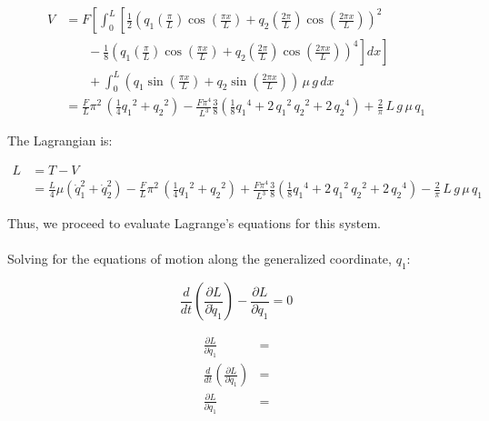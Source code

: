 \documentclass[12pt, letterpaper]{../assignment}
\begin{document}
\begin{equation*}
  \begin{aligned}
    V &= F \left[ \int_0^L \left[ \frac{1}{2}\left(q_1 \left(\frac{\pi}{L}\right) \cos\left(\frac{\pi x}{L}\right) + q_2 \left(\frac{2 \pi }{L}\right) \cos\left(\frac{2 \pi x}{L}\right)\right)^2 \right. \right. \\
    &\ \ \ \ \ \ \ \ - \left. \left. \frac{1}{8}\left(q_1 \left(\frac{\pi}{L}\right) \cos\left(\frac{\pi x}{L}\right) + q_2 \left(\frac{2 \pi }{L}\right) \cos\left(\frac{2 \pi x}{L}\right)\right)^4 \right] dx \right] \\
    &\ \ \ \ \ \ \ \ + \int_0^L \left( q_1 \sin\left(\frac{\pi x}{L}\right) + q_2 \sin\left(\frac{2 \pi x}{L}\right) \right)\,\mu\,g\, dx \\
    &= \frac{F}{L}\pi^2 \,{\left(\frac{1}{4}{q_1 }^2 +{q_2 }^2 \right)}
    -\frac{F\pi^4}{L^3}\frac{3}{8}{\left(\frac{1}{8}{q_1 }^4 +2\,{q_1 }^2 \,{q_2 }^2 +2\,{q_2 }^4 \right)}
    +\frac{2}{\pi}\,L\,g\,\mu \,q_1 
  \end{aligned}
\end{equation*}

The Lagrangian is:

\begin{equation*}
  \begin{aligned}
    L &= T - V \\
      &= \frac{L}{4}\mu \left( \dot{q}_1^2 + \dot{q}_2^2 \right)
      - \frac{F}{L}\pi^2 \,{\left(\frac{1}{4}{q_1 }^2 +{q_2 }^2 \right)}
      +\frac{F\pi^4}{L^3}\frac{3}{8}{\left(\frac{1}{8}{q_1 }^4 +2\,{q_1 }^2 \,{q_2 }^2 +2\,{q_2 }^4 \right)}
      -\frac{2}{\pi}\,L\,g\,\mu \,q_1 
  \end{aligned}
\end{equation*}

Thus, we proceed to evaluate Lagrange's equations for this system.
\\\\
Solving for the equations of motion along the generalized coordinate, $q_1$:

$$ \frac{d}{d t} \left( \frac{\partial L}{\partial \dot{q}_1}\right) - \frac{\partial L}{\partial q_1} = 0 $$

\begin{equation*}
  \begin{aligned}
    \frac{\partial L}{\partial \dot{q}_1} &= \\
    \frac{d}{d t} \left( \frac{\partial L}{\partial \dot{q}_1}\right) &= \\
    \frac{\partial L}{\partial {q}_1} &= 
  \end{aligned}
\end{equation*}
\end{document}
